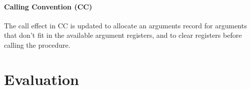 \documentclass[main.tex]{subfiles}
\begin{document}
\paragraph{Calling Convention (CC)} The call effect in CC is updated to allocate an arguments record for arguments that don't fit in the available argument registers, and to clear registers before calling the procedure.


\section{Evaluation} \label{sct:ghscc-eval}

\biblio{}
\onlyinsubfile{\glsaddall\printglossaries}
\end{document}
